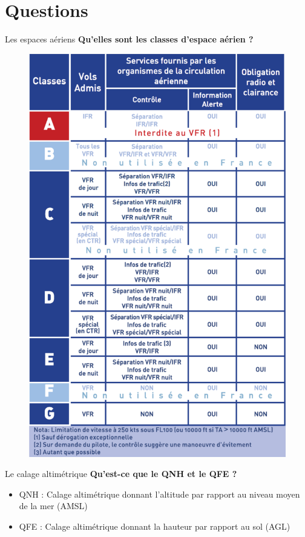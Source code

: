 \documentclass{beamer}
\begin{document}
\section{Questions}
\begin{frame}{Les espaces aériens}
  \textbf{Qu'elles sont les classes d'espace aérien ?}

  \pause
  \begin{figure}
    \centering
    \includegraphics[scale=0.43]{images/espaces-aeriens.png}
  \end{figure}
\end{frame}

\begin{frame}{Le calage altimétrique}
  \textbf{Qu'est-ce que le QNH et le QFE ?}
  
  \begin{itemize}
    \item QNH : Calage altimétrique donnant l'altitude par rapport au niveau moyen de la mer (AMSL) \pause
    \item QFE : Calage altimétrique donnant la hauteur par rapport au sol (AGL)
  \end{itemize}

\end{frame}
\end{document}
